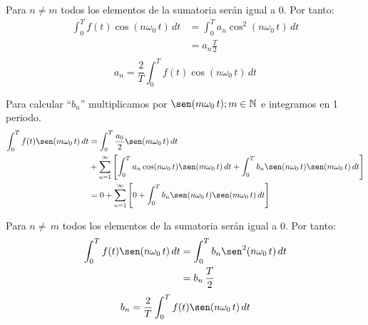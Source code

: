 Para $n\neq m$ todos los elementos de la sumatoria serán igual a $0$.
Por tanto:
\begin{equation*}
\begin{split}
    \int_{0}^{T}f(t)\cos(n\omega_0\,t)\,dt
        &=\int_{0}^{T}a_n\cos^2(n\omega_0\,t)\,dt\\
        &=a_n\frac{T}{2}\\
\end{split}
\end{equation*}
\begin{equation}
    a_n=\frac{2}{T}\int_{0}^{T}f(t)\cos(n\omega_0\,t)\,dt
\end{equation}

Para calcular ``$b_n$'' multiplicamos por $\sen(m\omega_0\,t);m\in\mathbb{N}$ e
integramos en 1 periodo.
\begin{equation*}
\begin{split}
    \int_{0}^{T}f(t)\sen(m\omega_0\,t)\,dt
        &=\int_{0}^{T}\frac{a_0}{2}\sen(m\omega_0\,t)\,dt\\
        &+\sum_{n=1}^{\infty}\left[
          \int_{0}^{T}a_n\cos(n\omega_0\,t)\sen(m\omega_0\,t)\,dt+
          \int_{0}^{T}b_n\sen(n\omega_0\,t)\sen(m\omega_0\,t)\,dt\right]\\
        &=0+\sum_{n=1}^{\infty}\left[
          0+\int_{0}^{T}b_n\sen(n\omega_0\,t)\sen(m\omega_0\,t)\,dt\right]\\
\end{split}
\end{equation*}

Para $n\neq\,m$ todos los elementos de la sumatoria serán igual a $0$.
Por tanto:
\begin{equation*}
\begin{split}
    \int_{0}^{T}f(t)\sen(n\omega_0\,t)\,dt
        &=\int_{0}^{T}b_n\sen^2(n\omega_0\,t)\,dt\\
        &=b_n\,\frac{T}{2}\\
\end{split}
\end{equation*}
\begin{equation}
    b_n=\frac{2}{T}\int_{0}^{T}f(t)\sen(n\omega_0\,t)\,dt
\end{equation}

